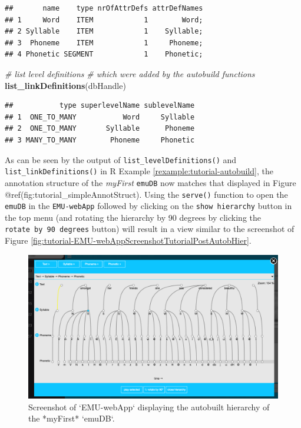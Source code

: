 \documentclass[]{book}
\newenvironment{Shaded}{\begin{snugshade}}{\end{snugshade}}
\newcommand{\CommentTok}[1]{\textcolor[rgb]{0.56,0.35,0.01}{\textit{#1}}}
\newcommand{\KeywordTok}[1]{\textcolor[rgb]{0.13,0.29,0.53}{\textbf{#1}}}
\newcommand{\NormalTok}[1]{#1}
\theoremstyle{definition}
\theoremstyle{definition}
\theoremstyle{definition}
\theoremstyle{remark}
\begin{document}
\begin{verbatim}
##       name    type nrOfAttrDefs attrDefNames
## 1     Word    ITEM            1        Word;
## 2 Syllable    ITEM            1    Syllable;
## 3  Phoneme    ITEM            1     Phoneme;
## 4 Phonetic SEGMENT            1    Phonetic;
\end{verbatim}

\begin{Shaded}
\begin{Highlighting}[]
\CommentTok{# list level definitions}
\CommentTok{# which were added by the autobuild functions}
\KeywordTok{list_linkDefinitions}\NormalTok{(dbHandle)}
\end{Highlighting}
\end{Shaded}

\begin{verbatim}
##           type superlevelName sublevelName
## 1  ONE_TO_MANY           Word     Syllable
## 2  ONE_TO_MANY       Syllable      Phoneme
## 3 MANY_TO_MANY        Phoneme     Phonetic
\end{verbatim}

As can be seen by the output of \texttt{list\_levelDefinitions()} and
\texttt{list\_linkDefinitions()} in R Example
\ref{rexample:tutorial-autobuild}, the annotation structure of the
\emph{myFirst} \texttt{emuDB} now matches that displayed in Figure
@ref(fig:tutorial\_simpleAnnotStruct). Using the \texttt{serve()}
function to open the \texttt{emuDB} in the \texttt{EMU-webApp} followed
by clicking on the \texttt{show\ hierarchy} button in the top menu (and
rotating the hierarchy by 90 degrees by clicking the
\texttt{rotate\ by\ 90\ degrees} button) will result in a view similar
to the screenshot of Figure
\ref{fig:tutorial-EMU-webAppScreenshotTutorialPostAutobHier}.

\begin{figure}

{\centering \includegraphics[width=1\linewidth]{pics/EMU-webAppScreenshotTutorialPostAutobHier} 

}

\caption{Screenshot of `EMU-webApp` displaying the autobuilt hierarchy of the *myFirst* `emuDB`.}\label{fig:webAppScreenshotTutorialPostAutobHier}
\end{figure}
\end{document}
